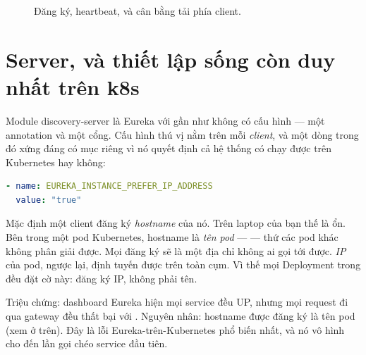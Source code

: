 \begin{figure}[h]
\centering
{}
\caption{Đăng ký, heartbeat, và cân bằng tải phía client.}
\end{figure}

\section{Server, và thiết lập sống còn duy nhất trên k8s}

Module discovery-server là Eureka với gần như không có cấu hình --- một
annotation  và một cổng. Cấu hình thú vị nằm
trên mỗi \emph{client}, và một dòng trong đó xứng đáng có mục riêng vì nó
quyết định cả hệ thống có chạy được trên Kubernetes hay không:

\begin{lstlisting}[language=yaml]
- name: EUREKA_INSTANCE_PREFER_IP_ADDRESS
  value: "true"
\end{lstlisting}

Mặc định một client đăng ký \emph{hostname} của nó. Trên laptop của bạn
thế là ổn. Bên trong một pod Kubernetes, hostname là \emph{tên pod} ---
 --- thứ các pod khác không phân giải
được. Mọi đăng ký sẽ là một địa chỉ không ai gọi tới được. \emph{IP} của
pod, ngược lại, định tuyến được trên toàn cụm. Vì thế mọi Deployment
trong  đều đặt cờ này: đăng ký IP, không phải tên.

\begin{pitfall}
Triệu chứng: dashboard Eureka hiện mọi service đều UP, nhưng mọi request
đi qua gateway đều thất bại với . Nguyên
nhân: hostname được đăng ký là tên pod (xem ở trên). Đây là lỗi
Eureka-trên-Kubernetes phổ biến nhất, và nó vô hình cho đến lần gọi
chéo service đầu tiên.
\end{pitfall}

